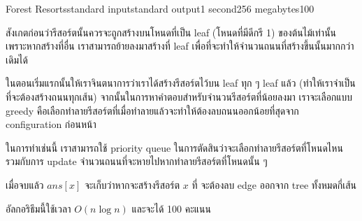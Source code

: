 \documentclass[11pt,a4paper]{article}
\begin{document}
\pagebreak

\begin{problem}{Forest Resorts}{standard input}{standard output}{1 second}{256 megabytes}{100}

สังเกตก่อนว่ารีสอร์ตนั้นควรจะถูกสร้างบนโหนดที่เป็น leaf (โหนดที่มีดีกรี 1) ของต้นไม้เท่านั้น เพราะหากสร้างที่อื่น เราสามารถย้ายลงมาสร้างที่ leaf เพื่อที่จะทำให้จำนวนถนนที่สร้างขึ้นนั้นมากกว่าเดิมได้

ในตอนเริ่มแรกนั้นให้เราจินตนาการว่าเราได้สร้างรีสอร์ตไว้บน leaf ทุก ๆ leaf แล้ว (ทำให้เราจำเป็นที่จะต้องสร้างถนนทุกเส้น) จากนั้นในการหาคำตอบสำหรับจำนวนรีสอร์ตที่น้อยลงมา เราจะเลือกแบบ greedy คือเลือกทำลายรีสอร์ตที่เมื่อทำลายแล้วจะทำให้ต้องลบถนนออกน้อยที่สุดจาก configuration ก่อนหน้า

ในการทำเช่นนี้ เราสามารถใช้ priority queue ในการตัดสินว่าจะเลือกทำลายรีสอร์ตที่โหนดไหน รวมกับการ update จำนวนถนนที่จะหายไปหากทำลายรีสอร์ตที่โหนดนั้น ๆ 

เมื่อจบแล้ว $ans[x]$ จะเก็บว่าหากจะสร้างรีสอร์ต $x$ ที่ จะต้องลบ edge ออกจาก tree ทั้งหมดกี่เส้น

อัลกอริธึมนี้ใช้เวลา $O(n \log n)$ และจะได้ 100 คะแนน

\end{problem}

\pagebreak
\end{document}
